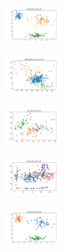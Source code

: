 \begin{figure}[H]
    \begin{subfigure}
        \centering
        \includegraphics[width=0.234\textwidth]{img/am10/rand_set_const_20_277451237_clust.png}
    \end{subfigure}
    \hfill
    \begin{subfigure}
        \centering
        \includegraphics[width=0.234\textwidth]{img/am10/newthyroid_set_const_20_277451237_clust.png}
    \end{subfigure}
    \hfill
    \begin{subfigure}
        \centering
        \includegraphics[width=0.234\textwidth]{img/am10/iris_set_const_20_49258669_clust.png}
    \end{subfigure}
    \hfill
    \begin{subfigure}
        \centering
        \includegraphics[width=0.234\textwidth]{img/am10/ecoli_set_const_20_49258669_clust.png}
    \end{subfigure}
    \hfill
    \begin{subfigure}
        \centering
        \includegraphics[width=0.234\textwidth]{img/am10/rand_set_const_20_49258669_clust.png}
    \end{subfigure}
    \hfill
    \begin{subfigure}
        \centering

\end{subfigure}
\end{figure}
